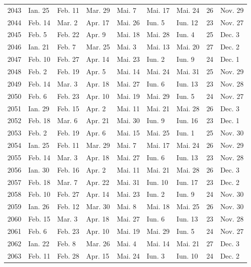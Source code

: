 \documentclass{article}
\begin{document}
\begin{tabular}{|c l l l l l l c l|}
2043 & Ian. 25 & Feb. 11 & Mar. 29 & Mai. 7 & Mai. 17 & Mai. 24 & 26 & Nov. 29 \\
2044 & Feb. 14 & Mar. 2 & Apr. 17 & Mai. 26 & Iun. 5 & Iun. 12 & 23 & Nov. 27 \\
2045 & Feb. 5 & Feb. 22 & Apr. 9 & Mai. 18 & Mai. 28 & Iun. 4 & 25 & Dec. 3 \\
2046 & Ian. 21 & Feb. 7 & Mar. 25 & Mai. 3 & Mai. 13 & Mai. 20 & 27 & Dec. 2 \\
2047 & Feb. 10 & Feb. 27 & Apr. 14 & Mai. 23 & Iun. 2 & Iun. 9 & 24 & Dec. 1 \\
2048 & Feb. 2 & Feb. 19 & Apr. 5 & Mai. 14 & Mai. 24 & Mai. 31 & 25 & Nov. 29 \\
2049 & Feb. 14 & Mar. 3 & Apr. 18 & Mai. 27 & Iun. 6 & Iun. 13 & 23 & Nov. 28 \\
2050 & Feb. 6 & Feb. 23 & Apr. 10 & Mai. 19 & Mai. 29 & Iun. 5 & 24 & Nov. 27 \\
2051 & Ian. 29 & Feb. 15 & Apr. 2 & Mai. 11 & Mai. 21 & Mai. 28 & 26 & Dec. 3 \\
2052 & Feb. 18 & Mar. 6 & Apr. 21 & Mai. 30 & Iun. 9 & Iun. 16 & 23 & Dec. 1 \\
2053 & Feb. 2 & Feb. 19 & Apr. 6 & Mai. 15 & Mai. 25 & Iun. 1 & 25 & Nov. 30 \\
2054 & Ian. 25 & Feb. 11 & Mar. 29 & Mai. 7 & Mai. 17 & Mai. 24 & 26 & Nov. 29 \\
2055 & Feb. 14 & Mar. 3 & Apr. 18 & Mai. 27 & Iun. 6 & Iun. 13 & 23 & Nov. 28 \\
2056 & Ian. 30 & Feb. 16 & Apr. 2 & Mai. 11 & Mai. 21 & Mai. 28 & 26 & Dec. 3 \\
2057 & Feb. 18 & Mar. 7 & Apr. 22 & Mai. 31 & Iun. 10 & Iun. 17 & 23 & Dec. 2 \\
2058 & Feb. 10 & Feb. 27 & Apr. 14 & Mai. 23 & Iun. 2 & Iun. 9 & 24 & Nov. 30 \\
2059 & Ian. 26 & Feb. 12 & Mar. 30 & Mai. 8 & Mai. 18 & Mai. 25 & 26 & Nov. 30 \\
2060 & Feb. 15 & Mar. 3 & Apr. 18 & Mai. 27 & Iun. 6 & Iun. 13 & 23 & Nov. 28 \\
2061 & Feb. 6 & Feb. 23 & Apr. 10 & Mai. 19 & Mai. 29 & Iun. 5 & 24 & Nov. 27 \\
2062 & Ian. 22 & Feb. 8 & Mar. 26 & Mai. 4 & Mai. 14 & Mai. 21 & 27 & Dec. 3 \\
2063 & Feb. 11 & Feb. 28 & Apr. 15 & Mai. 24 & Iun. 3 & Iun. 10 & 24 & Dec. 2 \\

\end{tabular}
\end{document}
